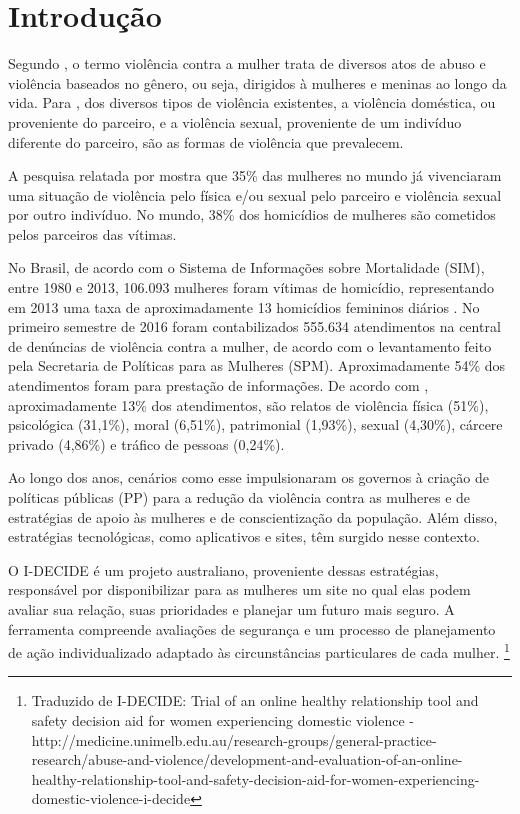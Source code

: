 \chapter[Introdução]{Introdução}

Segundo , o termo violência contra a mulher trata de
diversos atos de abuso e violência baseados no gênero, ou seja, dirigidos à mulheres e meninas ao longo da vida.
Para , dos diversos tipos de violência existentes, a violência doméstica, ou proveniente do parceiro,
e a violência sexual, proveniente de um indivíduo diferente do parceiro, são as formas de violência que prevalecem.

A pesquisa relatada por  mostra que 35\% das mulheres no mundo já vivenciaram uma situação
de violência pelo física e/ou sexual pelo parceiro e violência sexual por outro indivíduo. No mundo, 38\% dos homicídios de mulheres são cometidos pelos parceiros das vítimas.

No Brasil, de acordo com o Sistema de Informações sobre Mortalidade (SIM), entre 1980 e 2013, 106.093 mulheres foram vítimas de homicídio, representando em 2013 uma taxa de aproximadamente 13 homicídios femininos
diários \cite{mapa_violencia_2015}. 
No primeiro semestre de 2016 foram contabilizados 555.634 atendimentos na central de denúncias 
de violência contra a mulher, de acordo com o levantamento feito pela Secretaria de Políticas para as Mulheres (SPM). 
Aproximadamente 54\% dos atendimentos foram para prestação de informações. De acordo com \cite{portal_180}, aproximadamente 13\% dos atendimentos, são relatos de violência física (51\%), psicológica (31,1\%), moral (6,51\%), patrimonial (1,93\%), sexual (4,30\%), cárcere privado (4,86\%) e tráfico de pessoas (0,24\%).

Ao longo dos anos, cenários como esse impulsionaram os governos à criação de políticas públicas (PP) para a redução da violência contra as mulheres e de estratégias de apoio às mulheres e de conscientização da população. Além disso, estratégias tecnológicas, como aplicativos e sites, têm surgido nesse contexto.

O I-DECIDE é um projeto australiano, proveniente dessas estratégias, responsável por disponibilizar para as mulheres um site
no qual elas podem avaliar sua relação, suas prioridades e planejar um futuro mais seguro. A ferramenta compreende avaliações de segurança e um processo de planejamento de ação individualizado adaptado às circunstâncias particulares de cada mulher. \footnote{Traduzido de I-DECIDE: Trial of an online healthy relationship tool and safety decision aid for women experiencing domestic violence - http://medicine.unimelb.edu.au/research-groups/general-practice-research/abuse-and-violence/development-and-evaluation-of-an-online-healthy-relationship-tool-and-safety-decision-aid-for-women-experiencing-domestic-violence-i-decide}

